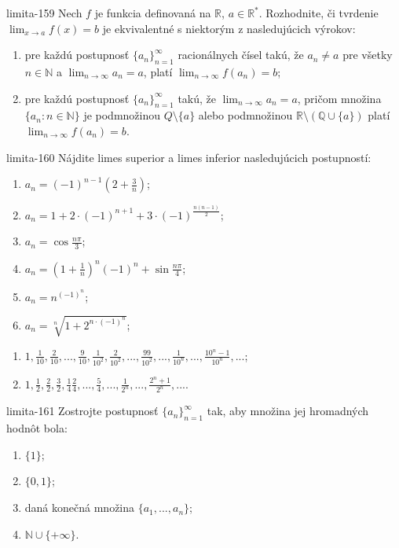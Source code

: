 \begin{defproblem}{limita-159}
Nech $f$ je funkcia definovaná na $\mathbb{R}$, $a \in \mathbb{R^*}$. Rozhodnite, či tvrdenie $\lim_{x \rightarrow a} f(x)=b$ je ekvivalentné s niektorým z nasledujúcich výrokov:
\begin{enumerate}
\item pre každú postupnosť ${\{a_n\}}_{n=1}^\infty$ racionálnych čísel takú, že $a_n \neq a$ pre všetky $n \in \mathbb{N}$ a $\lim_{n \rightarrow \infty} a_n=a$, platí $\lim_{n \rightarrow \infty} f(a_n)=b$;
\item pre každú postupnosť ${\{a_n\}}_{n=1}^\infty$ takú, že $\lim_{n \rightarrow \infty} a_n=a$, pričom množina $\{ a_n : n\in \mathbb{N }\}$ je podmnožinou $Q \setminus \{ a\}$ alebo podmnožinou $\mathbb{R} \setminus (\mathbb{Q} \cup \{ a\})$ platí $\lim_{n \rightarrow \infty} f(a_n)=b$.
\end{enumerate}
\end{defproblem}

\begin{defproblem}{limita-160}
Nájdite limes superior a limes inferior nasledujúcich postupností:
\begin{multicols}{2}
\begin{enumerate}
    \item $a_n=(-1)^{n-1}(2+\frac{3}{n})$;
    \item $a_n=1+2 \cdot (-1)^{n+1}+3 \cdot (-1)^{\frac{n(n-1)}{2}}$;
    \item $a_n=\cos \frac{n \pi}{3}$;
    \item $a_n=(1+\frac{1}{n})^n(-1)^n+\sin \frac{n \pi}{4}$;
    \item $a_n=n^{(-1)^n}$;
    \item $a_n=\sqrt[n]{1+2^{n \cdot (-1)^n}}$;
\end{enumerate}
\end{multicols}
\begin{enumerate}[resume]
    \item $1,\frac{1}{10},\frac{2}{10},...,\frac{9}{10},\frac{1}{10^2},\frac{2}{10^2},...,\frac{99}{10^2},...,\frac{1}{10^n},...,\frac{10^n-1}{10^n},...$;
    \item $1,\frac{1}{2},\frac{2}{2},\frac{3}{2},\frac{1}{4}\frac{2}{4},...,\frac{5}{4},...,\frac{1}{2^n},...,\frac{2^n+1}{2^n},... $.
\end{enumerate}
\end{defproblem}

\begin{defproblem}{limita-161}
Zostrojte postupnosť ${\{a_n\}}_{n=1}^\infty$ tak, aby množina jej hromadných hodnôt bola:
\begin{enumerate}
\item $\{ 1\}$;
\item $\{ 0,1\}$;
\item daná konečná množina $\{ a_1,...,a_n\}$;
\item $\mathbb{N} \cup \{ +\infty \}$.
\end{enumerate}
\end{defproblem}

